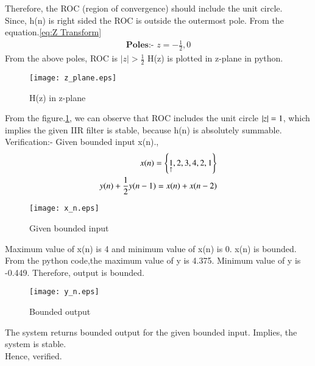 \documentclass[journal,12pt,twocolumn]{IEEEtran}
\begin{document}
Therefore, the ROC (region of convergence) should include the unit circle.\\
Since, h(n) is right sided the ROC is outside the outermost pole.
From the equation.\ref{eq:Z Transform}
\begin{align}
    \textbf{Poles:- } z = -\frac{1}{2},0
\end{align}
From the above poles, ROC is $|z|>\frac{1}{2}$
H(z) is plotted in z-plane in python.
\begin{figure}[h!]
    \centering
    \texttt{[image: z\_plane.eps]}
    \caption{H(z) in z-plane}
    \label{Z_plane analysis}
\end{figure}
From the figure.\ref{Z_plane analysis}, we can observe that ROC includes the unit circle $\left\vert z\right\vert = 1$, which implies the given IIR filter is stable, because h(n) is absolutely summable.\\
Verification:- Given bounded input x(n).,
\begin{align}
    x(n) = \left\{\underset{\uparrow}{1},2,3,4,2,1\right\}\\
    y(n)+\frac{1}{2}y(n-1) = x(n)+x(n-2)
\end{align}
\begin{figure}[h!]
    \centering
    \texttt{[image: x\_n.eps]}
    \caption{Given bounded input}
    \label{xn}
\end{figure}
Maximum value of x(n) is 4 and minimum value of x(n) is
0. x(n) is bounded.\\
From the python code,the maximum value of y is 4.375. Minimum value of y is -0.449. Therefore, output is bounded.\\
\begin{figure}[h!]
    \centering
    \texttt{[image: y\_n.eps]}
    \caption{Bounded output}
    \label{yn}
\end{figure}
The system returns bounded output for the given bounded input. Implies, the system is stable.\\ Hence, verified.
\end{document}
